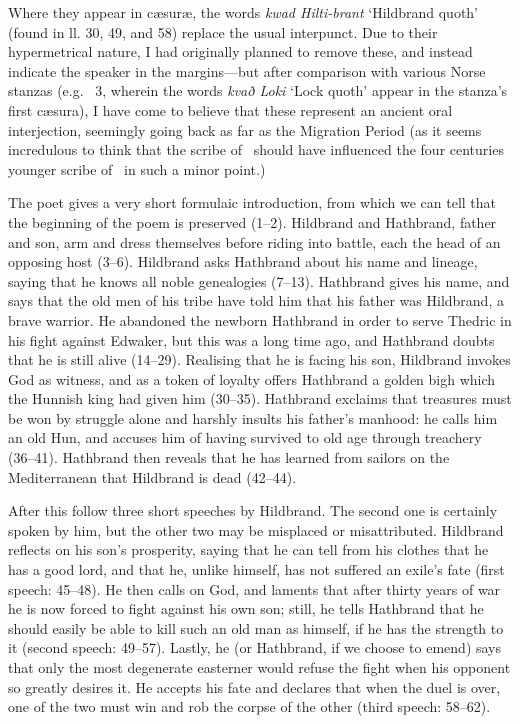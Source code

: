 Where they appear in cæsuræ, the words \emph{kwad Hilti-brant} ‘Hildbrand quoth’ (found in ll. 30, 49, and 58) replace the usual interpunct. Due to their hypermetrical nature, I had originally planned to remove these, and instead indicate the speaker in the margins—but after comparison with various Norse stanzas (e.g. \Reginsmal\ 3, wherein the words \emph{kvað Loki} ‘Lock quoth’ appear in the stanza’s first cæsura), I have come to believe that these represent an ancient oral interjection, seemingly going back as far as the Migration Period (as it seems incredulous to think that the scribe of \HildMS\ should have influenced the four centuries younger scribe of \Regius\ in such a minor point.)


\sectionline

The poet gives a very short formulaic introduction, from which we can tell that the beginning of the poem is preserved (1–2). Hildbrand and Hathbrand, father and son, arm and dress themselves before riding into battle, each the head of an opposing host (3–6). Hildbrand asks Hathbrand about his name and lineage, saying that he knows all noble genealogies (7–13). Hathbrand gives his name, and says that the old men of his tribe have told him that his father was Hildbrand, a brave warrior. He abandoned the newborn Hathbrand in order to serve Thedric in his fight against Edwaker, but this was a long time ago, and Hathbrand doubts that he is still alive (14–29). Realising that he is facing his son, Hildbrand invokes God as witness, and as a token of loyalty offers Hathbrand a golden bigh which the Hunnish king had given him (30–35). Hathbrand exclaims that treasures must be won by struggle alone and harshly insults his father’s manhood: he calls him an old Hun, and accuses him of having survived to old age through treachery (36–41). Hathbrand then reveals that he has learned from sailors on the Mediterranean that Hildbrand is dead (42–44).

After this follow three short speeches by Hildbrand. The second one is certainly spoken by him, but the other two may be misplaced or misattributed. Hildbrand reflects on his son’s prosperity, saying that he can tell from his clothes that he has a good lord, and that he, unlike himself, has not suffered an exile’s fate (first speech: 45–48). He then calls on God, and laments that after thirty years of war he is now forced to fight against his own son; still, he tells Hathbrand that he should easily be able to kill such an old man as himself, if he has the strength to it (second speech: 49–57). Lastly, he (or Hathbrand, if we choose to emend) says that only the most degenerate easterner would refuse the fight when his opponent so greatly desires it. He accepts his fate and declares that when the duel is over, one of the two must win and rob the corpse of the other (third speech: 58–62).

